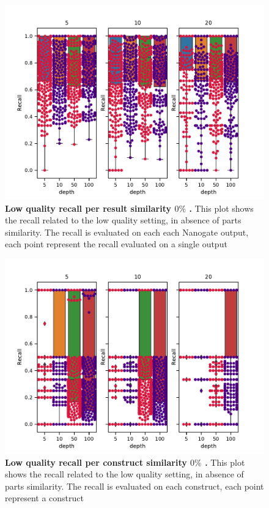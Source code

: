\documentclass[11pt, a4paper]{article}
\begin{document}
 \begin{figure}[ht]
    \begin{center}
    \includegraphics[width=1.35\textwidth]{../results/images_notebook/v_460/lq_sim_00_recall_per_result.pdf}
    \end{center}
    \caption{{\bf Low quality recall per result similarity $0\%$ .}  This plot shows the recall related to the low quality setting, in absence of parts similarity. The recall is evaluated on each each Nanogate output, each point represent the recall evaluated on a single output}
   \label{fig:v_460_lq_sim_00_recall_per_result}
\end{figure}


 \begin{figure}[ht]
    \begin{center}
    \includegraphics[width=1.35\textwidth]{../results/images_notebook/v_460/lq_sim_00_recall_per_construct.pdf}
    \end{center}
    \caption{{\bf Low quality recall per construct similarity $0\%$ .}  This plot shows the recall related to the low quality setting, in absence of parts similarity. The recall is evaluated on each construct, each point represent a construct}
   \label{fig:v_460_lq_sim_00_recall_per_construct}
\end{figure}
\end{document}
